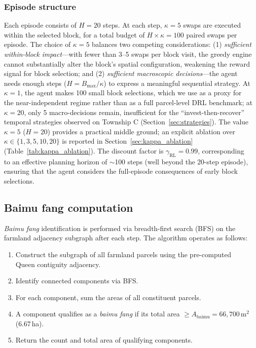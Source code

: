 \documentclass[preprint,12pt]{elsarticle}
\begin{document}
\subsubsection{Episode structure}

Each episode consists of $H = 20$ steps. At each step, $\kappa = 5$ swaps are executed within the selected block, for a total budget of $H \times \kappa = 100$ paired swaps per episode. The choice of $\kappa = 5$ balances two competing considerations: (1) \textit{sufficient within-block impact}---with fewer than 3--5 swaps per block visit, the greedy engine cannot substantially alter the block's spatial configuration, weakening the reward signal for block selection; and (2) \textit{sufficient macroscopic decisions}---the agent needs enough steps ($H = B_{\max}/\kappa$) to express a meaningful sequential strategy. At $\kappa = 1$, the agent makes 100 small block selections, which we use as a proxy for the near-independent regime rather than as a full parcel-level DRL benchmark; at $\kappa = 20$, only 5 macro-decisions remain, insufficient for the ``invest-then-recover'' temporal strategies observed on Township C (Section~\ref{sec:strategies}). The value $\kappa = 5$ ($H = 20$) provides a practical middle ground; an explicit ablation over $\kappa \in \{1,3,5,10,20\}$ is reported in Section~\ref{sec:kappa_ablation} (Table~\ref{tab:kappa_ablation}). The discount factor is $\gamma_{\text{RL}} = 0.99$, corresponding to an effective planning horizon of $\sim$100 steps (well beyond the 20-step episode), ensuring that the agent considers the full-episode consequences of early block selections.

\subsection{Baimu fang computation}
\label{sec:baimu}

\textit{Baimu fang} identification is performed via breadth-first search (BFS) on the farmland adjacency subgraph after each step. The algorithm operates as follows:

\begin{enumerate}
\item Construct the subgraph of all farmland parcels using the pre-computed Queen contiguity adjacency.
\item Identify connected components via BFS.
\item For each component, sum the areas of all constituent parcels.
\item A component qualifies as a \textit{baimu fang} if its total area $\geq A_{\text{baimu}} = 66{,}700$\,m$^2$ (6.67\,ha).
\item Return the count and total area of qualifying components.
\end{enumerate}
\end{document}
